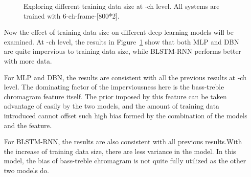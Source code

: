 \begin{figure}[h]
	\caption{Exploring different training data size at -ch level. All systems are trained with 6-ch-frame-[800*2].}
	\label{fig:3-ch-data}
\end{figure}

Now the effect of training data size on different deep learning models will be examined. At -ch level, the results in Figure~\ref{fig:3-ch-data} show that both MLP and DBN are quite impervious to training data size, while BLSTM-RNN performs better with more data. 

For MLP and DBN, the results are consistent with all the previous results at -ch level. The dominating factor of the imperviousness here is the bass-treble chromagram feature itself. The prior imposed by this feature can be taken advantage of easily by the two models, and the amount of training data introduced cannot offset such high bias formed by the combination of the models and the feature.

For BLSTM-RNN, the results are also consistent with all previous results.With the increase of training data size, there are less variance in the model. In this model, the bias of bass-treble chromagram is not quite fully utilized as the other two models do.

